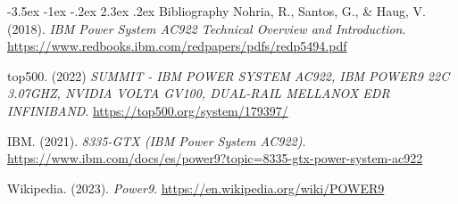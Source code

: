 \documentclass{report}
\makeatletter
\renewcommand\chapter{\@startsection{chapter}{0}{\z@}%
    {-3.5ex \@plus -1ex \@minus -.2ex}%
    {2.3ex \@plus.2ex}%
    {\normalfont\Large\bfseries}}
\makeatother
\begin{document}
\chapter{Bibliography}
\setlength{\parindent}{0em}
Nohria, R., Santos, G., \& Haug, V. (2018). \emph{IBM Power System AC922 Technical Overview and Introduction}. \url{https://www.redbooks.ibm.com/redpapers/pdfs/redp5494.pdf}

top500. (2022) \emph{SUMMIT - IBM POWER SYSTEM AC922, IBM POWER9 22C 3.07GHZ, NVIDIA VOLTA GV100, DUAL-RAIL MELLANOX EDR INFINIBAND}. \url{https://top500.org/system/179397/}

IBM. (2021). \emph{8335-GTX (IBM Power System AC922)}. \\ \url{https://www.ibm.com/docs/es/power9?topic=8335-gtx-power-system-ac922}

Wikipedia. (2023). \emph{Power9}. \url{https://en.wikipedia.org/wiki/POWER9}
\end{document}
